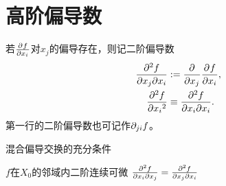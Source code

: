 \section{高阶偏导数}
\begin{definition}{}{}
	若$\pv f{x_i}$对$x_j$的偏导存在，则记二阶偏导数
	\begin{subequations}\label{eq:calc-second-partials}
		\begin{align}
			\pw f{x_j}{x_i} &:= \pp{x_j}\pv f{x_i},\\
			\pv[2]f{x_i} &\equiv \pw f{x_i}{x_i}.
		\end{align}
	\end{subequations}
	第一行的二阶偏导数也可记作$\p_{ji}f$。
\end{definition}
\begin{theorem}{混合偏导交换的充分条件}{}
	\begin{center}
		$f$在$X_0$的邻域内二阶连续可微
		\vimplies
		$\pw f{x_i}{x_j} = \pw f{x_j}{x_i}$
	\end{center}
\end{theorem}
